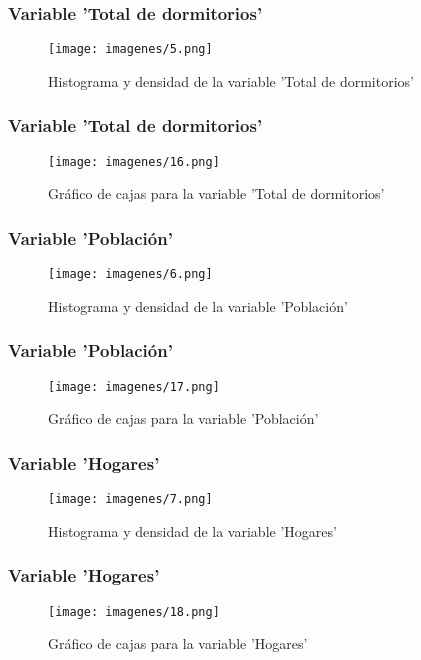 \documentclass[12pt]{beamer}
\begin{document}
\begin{frame}
\frametitle{Variable 'Total de dormitorios'}
\begin{figure}[!h]
    \begin{center}
        \texttt{[image: imagenes/5.png]}
        \caption{Histograma y densidad de la variable 'Total de dormitorios'}
        \label{fig:Densidad}
    \end{center}
\end{figure}
\end{frame}
\begin{frame}
\frametitle{Variable 'Total de dormitorios'}
\begin{figure}[!h]
    \begin{center}
        \texttt{[image: imagenes/16.png]}
        \caption{Gráfico de cajas para la variable 'Total de dormitorios'}
        \label{fig:Densidad}
    \end{center}
\end{figure}
\end{frame}
\begin{frame}
\frametitle{Variable 'Población'}
\begin{figure}[!h]
    \begin{center}
        \texttt{[image: imagenes/6.png]}
        \caption{Histograma y densidad de la variable 'Población'}
        \label{fig:Densidad}
    \end{center}
\end{figure}
\end{frame}
\begin{frame}
\frametitle{Variable 'Población'}
\begin{figure}[!h]
    \begin{center}
        \texttt{[image: imagenes/17.png]}
        \caption{Gráfico de cajas para la variable 'Población'}
        \label{fig:Densidad}
    \end{center}
\end{figure}
\end{frame}

\begin{frame}
\frametitle{Variable 'Hogares'}
\begin{figure}[!h]
    \begin{center}
        \texttt{[image: imagenes/7.png]}
        \caption{Histograma y densidad de la variable 'Hogares'}
        \label{fig:Densidad}
    \end{center}
\end{figure}
\end{frame}
\begin{frame}
\frametitle{Variable 'Hogares'}
\begin{figure}[!h]
    \begin{center}
        \texttt{[image: imagenes/18.png]}
        \caption{Gráfico de cajas para la variable 'Hogares'}
        \label{fig:Densidad}
    \end{center}
\end{figure}
\end{frame}
\end{document}
